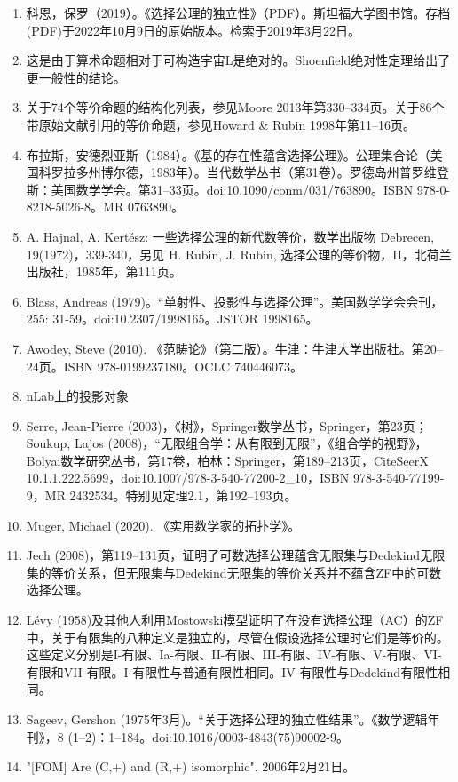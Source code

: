 \begin{enumerate}
\item 科恩，保罗（2019）。《选择公理的独立性》（PDF）。斯坦福大学图书馆。存档(PDF)于2022年10月9日的原始版本。检索于2019年3月22日。
\item 这是由于算术命题相对于可构造宇宙L是绝对的。Shoenfield绝对性定理给出了更一般性的结论。
\item 关于74个等价命题的结构化列表，参见Moore 2013年第330–334页。关于86个带原始文献引用的等价命题，参见Howard & Rubin 1998年第11–16页。
\item 布拉斯，安德烈亚斯（1984）。《基的存在性蕴含选择公理》。公理集合论（美国科罗拉多州博尔德，1983年）。当代数学丛书（第31卷）。罗德岛州普罗维登斯：美国数学学会。第31–33页。doi:10.1090/conm/031/763890。ISBN 978-0-8218-5026-8。MR 0763890。
\item A. Hajnal, A. Kertész: 一些选择公理的新代数等价，数学出版物 Debrecen, 19(1972)，339-340，另见 H. Rubin, J. Rubin, 选择公理的等价物，II，北荷兰出版社，1985年，第111页。  
\item Blass, Andreas (1979)。“单射性、投影性与选择公理”。美国数学学会会刊，255: 31-59。doi:10.2307/1998165。JSTOR 1998165。
\item Awodey, Steve (2010). 《范畴论》（第二版）。牛津：牛津大学出版社。第20–24页。ISBN 978-0199237180。OCLC 740446073。  
\item nLab上的投影对象  
\item Serre, Jean-Pierre (2003)，《树》，Springer数学丛书，Springer，第23页；Soukup, Lajos (2008)，“无限组合学：从有限到无限”，《组合学的视野》，Bolyai数学研究丛书，第17卷，柏林：Springer，第189–213页，CiteSeerX 10.1.1.222.5699，doi:10.1007/978-3-540-77200-2_10，ISBN 978-3-540-77199-9，MR 2432534。特别见定理2.1，第192–193页。  
\item Muger, Michael (2020). 《实用数学家的拓扑学》。
\item Jech (2008)，第119–131页，证明了可数选择公理蕴含无限集与Dedekind无限集的等价关系，但无限集与Dedekind无限集的等价关系并不蕴含ZF中的可数选择公理。  
\item Lévy (1958)及其他人利用Mostowski模型证明了在没有选择公理（AC）的ZF中，关于有限集的八种定义是独立的，尽管在假设选择公理时它们是等价的。这些定义分别是I-有限、Ia-有限、II-有限、III-有限、IV-有限、V-有限、VI-有限和VII-有限。I-有限性与普通有限性相同。IV-有限性与Dedekind有限性相同。  
\item Sageev, Gershon (1975年3月)。“关于选择公理的独立性结果”。《数学逻辑年刊》，8 (1–2)：1–184。doi:10.1016/0003-4843(75)90002-9。
\item "[FOM] Are (C,+) and (R,+) isomorphic". 2006年2月21日。  

\end{enumerate}
